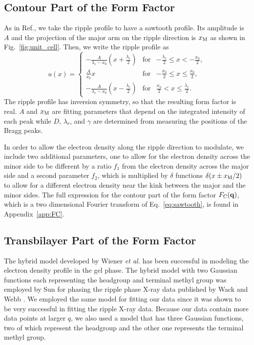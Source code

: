 \subsection{Contour Part of the Form Factor}\label{sec:contour}
As in Ref.\cite{ref:Sun96}, we take the ripple profile to have a sawtooth profile. Its
amplitude is $A$ and the projection of the major arm on the 
ripple direction is $x_\textrm{M}$ as shown in Fig.~\ref{fig:unit_cell}. 
Then, we write the ripple profile as
\begin{equation}
  u(x) = \left\{
    \begin{array}{ccc}
    -\frac{A}{\lambda_r-x_0}\left(x+\frac{\lambda_r}{2}\right) 
      & \text{for} 
      & -\frac{\lambda_r}{2} \leq x < -\frac{x_0}{2}, \\
    \frac{A}{x_0}x 
      & \text{for} 
      & -\frac{x_0}{2} \leq x \leq \frac{x_0}{2}, \\
    -\frac{A}{\lambda_r-x_0} \left(x-\frac{\lambda_r}{2}\right)
      & \text{for} 
      & \frac{x_0}{2} < x \leq \frac{\lambda_r}{2}.
    \end{array} \right.
  \label{eq:sawtooth}
\end{equation}
The ripple profile has inversion symmetry, so that the resulting
form factor is real. $A$ and $x_\textrm{M}$ are fitting parameters that depend 
on the integrated intensity of each peak while $D$, $\lambda_r$, and $\gamma$
are determined from measuring the positions of the Bragg peaks.

In order to allow the electron density along the ripple direction to 
modulate, we include two additional parameters, one to allow for the electron
density across the minor side to be different by a ratio $f_1$ from the 
electron density across the major side and a second parameter $f_2$, which
is multiplied by $\delta$ functions $\delta(x \pm x_\textrm{M}/2)$ to allow for 
a different electron density near the kink between the major and the minor
sides. The full expression for the contour part of the form factor $F_\mathrm{C}(\mathbf{q})$,
which is a two dimensional Fourier transform of Eq.~\ref{eq:sawtooth},
is found in Appendix~\ref{app:FC}.

\subsection{Transbilayer Part of the Form Factor}\label{sec:transbilayer}
The hybrid model developed by Wiener \textit{et al.} \cite{ref:Wiener89} has
been successful in modeling the electron density profile in the gel phase.
The hybrid model with two Gaussian functions each representing the headgroup and
terminal methyl group was employed by Sun  \cite{ref:Sun96}
for phasing the ripple phase X-ray data published by Wack and Webb \cite{ref:Wack89}.
We employed the same model for fitting our data 
since it was shown to be very successful in fitting the ripple X-ray data.
Because our data contain more data points at larger $q$, we also used
a model that has three  Gaussian functions, two of which represent the headgroup 
and the other one represents the terminal methyl group. 

